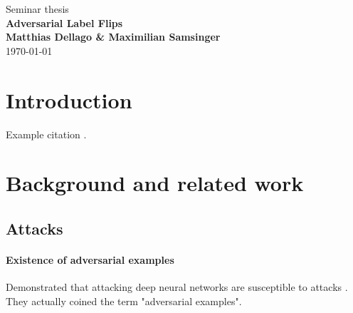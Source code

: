 \documentclass{article}
\begin{document}
\begin{titlepage}
	\noindent{}
	\vspace{3cm}
	\begin{center}
		{\Large Seminar thesis}
		\vspace{50pt}\\
		\textbf{\Huge Adversarial Label Flips}
		\vspace{40pt}\\
		\textbf{\Large Matthias Dellago \& Maximilian Samsinger}\vspace{20pt}\\
		{\large\today}
		\vspace{120pt}
	\end{center}
\end{titlepage}
	
	\DeclarePairedDelimiter\abs{\lvert}{\rvert}%
	\DeclarePairedDelimiter\norm{\lVert}{\rVert}%
	\DeclarePairedDelimiter\ceil{\lceil}{\rceil}
	\DeclarePairedDelimiter\floor{\lfloor}{\rfloor}
	
\begin{abstract}
	\blindtext
\end{abstract}

\section{Introduction}
Example citation \cite{madry2017towards}.


\section{Background and related work}

\subsection{Attacks}
\paragraph{Existence of adversarial examples}
Demonstrated that attacking deep neural networks are susceptible to attacks \cite{Szegedy13}. They actually coined the term "adversarial examples".
\end{document}
